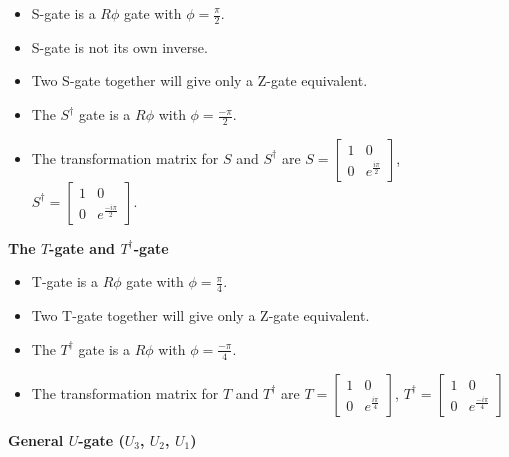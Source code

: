\documentclass{article}
\begin{document}
\begin{itemize}
    \item S-gate is a $R\phi$ gate with $\phi = \frac{\pi}{2}$.
    \item S-gate is not its own inverse.
    \item Two S-gate together will give only a Z-gate equivalent.
    \item The $S^{\dagger}$ gate is a $R\phi$ with $\phi = \frac{-\pi}{2}$.
    \item The transformation matrix for $S$ and $S^{\dagger}$ are 
$S = \begin{bmatrix}1&0\\ 0 & e^{\frac{i\pi}{2}}\end{bmatrix}$,\\
$S^{\dagger} = \begin{bmatrix}1&0\\ 0 & e^{\frac{-i\pi}{2}}\end{bmatrix}$.
\end{itemize}
\textbf{The $T$-gate and $T^{\dagger}$-gate}
\begin{itemize}
    \item T-gate is a $R\phi$ gate with $\phi = \frac{\pi}{4}$.
    \item Two T-gate together will give only a Z-gate equivalent.
    \item The $T^{\dagger}$ gate is a $R\phi$ with $\phi = \frac{-\pi}{4}$.
    \item The transformation matrix for $T$ and $T^{\dagger}$ are 
$T = \begin{bmatrix}1&0\\ 0 & e^{\frac{i\pi}{4}}\end{bmatrix}$,
$T^{\dagger} = \begin{bmatrix}1&0\\ 0 & e^{\frac{-i\pi}{4}}\end{bmatrix}$
\end{itemize}
\newpage
\textbf{General $U$-gate ($U_{3}$, $U_{2}$, $U_{1}$)}\\
\end{document}

